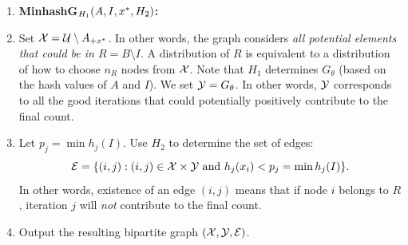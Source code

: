 \begin{enumerate}
\item[] \hspace{-2em} {\bf MinhashG$_{H_1}(A, I, {x^*}, H_2)$: }

\item Set  $\mathcal{X} = \mathcal{U} \setminus A_{+{x^*}}$. In other words, the
graph considers {\em all potential elements that could be in $R = B\setminus I$}. A
distribution of $R$ is equivalent to a distribution of how to choose
$n_R$ nodes from $\mathcal{X}$.
Note that $H_1$ determines $G_\theta$ (based on the hash values of $A$ and $I$).
We set $\mathcal{Y} = G_\theta$. In other words, $\mathcal{Y}$ corresponds to all the good
iterations that could potentially positively contribute to the final count. 

\item 
Let $p_j = \min h_j(I)$. Use $H_2$ to determine the set of edges: 
%
\[\mathcal{E} = \{ (i, j): (i, j) \in \mathcal{X} \times \mathcal{Y} \mbox{ and } h_j(x_i) < p_j = \min h_j(I) \}.\]
%
In other words, existence of an edge $(i,j)$ means that if node $i$
belongs to $R$, iteration $j$ will {\em not} contribute to the final
count. 

\item Output the resulting bipartite graph $(\mathcal{X}, \mathcal{Y}, \mathcal{E})$. 
\end{enumerate}

